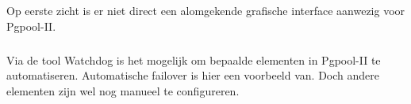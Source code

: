 \subsection{}
\label{subsec:Could have}


\subsubsection{}
\label{subsubsec:Grafische interface}

Op eerste zicht is er niet direct een alomgekende grafische interface aanwezig voor Pgpool-II.

\subsubsection{}
\label{subsubsec:Beperkte manuele interventie}

Via de tool Watchdog is het mogelijk om bepaalde elementen in Pgpool-II te automatiseren. Automatische failover is hier een voorbeeld van. Doch andere elementen zijn wel nog manueel te configureren.

